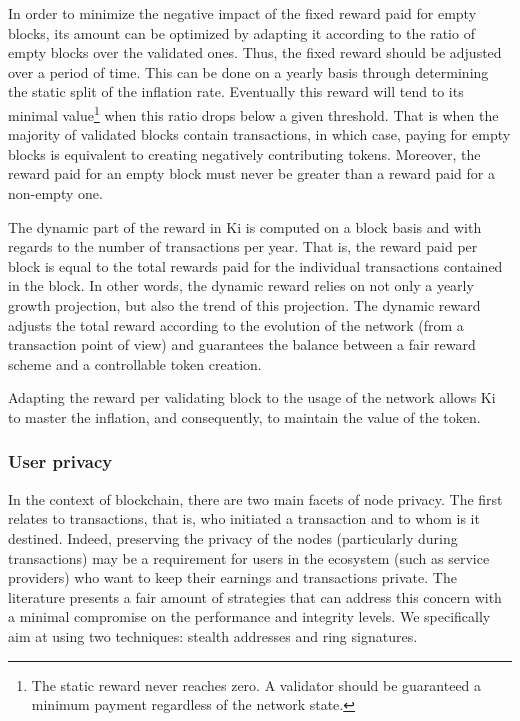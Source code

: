In order to minimize the negative impact of the fixed reward paid for empty blocks, its amount can be optimized by adapting it according to the ratio of empty blocks over the validated ones. Thus, the fixed reward should be adjusted over a period of time. This can be done on a yearly basis through determining the static split of the inflation rate. Eventually this reward will tend to its minimal value\footnote{The static reward never reaches zero. A validator should be guaranteed a minimum payment regardless of the network state.} when this ratio drops below a given threshold. That is when the majority of validated blocks contain transactions, in which case, paying for empty blocks is equivalent to creating negatively contributing tokens. Moreover, the reward paid for an empty block must never be greater than a reward paid for a non-empty one. 

The dynamic part of the reward in Ki is computed on a block basis and with regards to the number of transactions per year. That is, the reward paid per block is equal to the total rewards paid for the individual transactions contained in the block.  In other words, the dynamic reward  relies on not only a yearly growth projection, but also the trend of this projection. The dynamic reward adjusts the total reward according to the evolution of the network (from a transaction point of view) and guarantees the balance between a fair reward scheme and a controllable token creation. 

Adapting the reward per validating block to the usage of the network allows Ki to master the inflation, and consequently, to maintain the value of the token.

\subsubsection{User privacy}
\label{sec:kiblockchainprivacy}
In the context of blockchain, there are two main facets of node privacy. The first relates to transactions, that is, who initiated a transaction and to whom is it destined. Indeed, preserving the privacy of the nodes (particularly during transactions) may be a requirement for users in the ecosystem (such as service providers) who want to keep their earnings and transactions private. The literature presents a fair amount of strategies that can address this concern with a minimal compromise on the performance and integrity levels. We specifically aim at using two techniques: stealth addresses\cite{CryptoNote} and ring signatures\cite{rivest2001leak}. 


